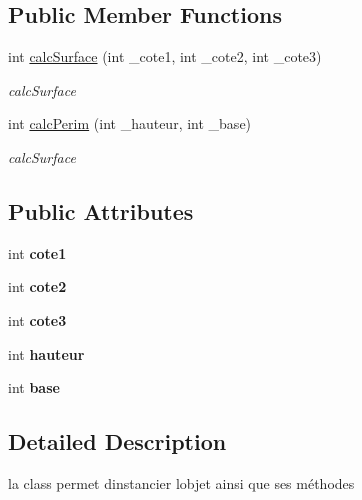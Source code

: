 \subsection*{Public Member Functions}
\begin{DoxyCompactItemize}
\item 
int \hyperlink{classtriangle_ac5fc18c9689b3cf055b431cfd189fe3b}{calc\+Surface} (int \+\_\+cote1, int \+\_\+cote2, int \+\_\+cote3)
\begin{DoxyCompactList}\small\item\em calc\+Surface \end{DoxyCompactList}\item 
int \hyperlink{classtriangle_add93fe57e11592724508a1236b1178bf}{calc\+Perim} (int \+\_\+hauteur, int \+\_\+base)
\begin{DoxyCompactList}\small\item\em calc\+Surface \end{DoxyCompactList}\end{DoxyCompactItemize}
\subsection*{Public Attributes}
\begin{DoxyCompactItemize}
\item 
\mbox{\label{classtriangle_aa241ebfeffaa2380d7be72c0d11de72d}} 
int {\bfseries cote1}
\item 
\mbox{\label{classtriangle_a323803e1c48fb9dace4f57d77072902e}} 
int {\bfseries cote2}
\item 
\mbox{\label{classtriangle_ad72ee9ea67e6042ad0a87b9ba791a9d6}} 
int {\bfseries cote3}
\item 
\mbox{\label{classtriangle_a537cf5aab61c3e499414a8e8b32aee0d}} 
int {\bfseries hauteur}
\item 
\mbox{\label{classtriangle_a2b3dabbc0590c1b43f52642094ac253c}} 
int {\bfseries base}
\end{DoxyCompactItemize}


\subsection{Detailed Description}
la class permet d\textquotesingle{}instancier l\textquotesingle{}objet ainsi que ses méthodes 


